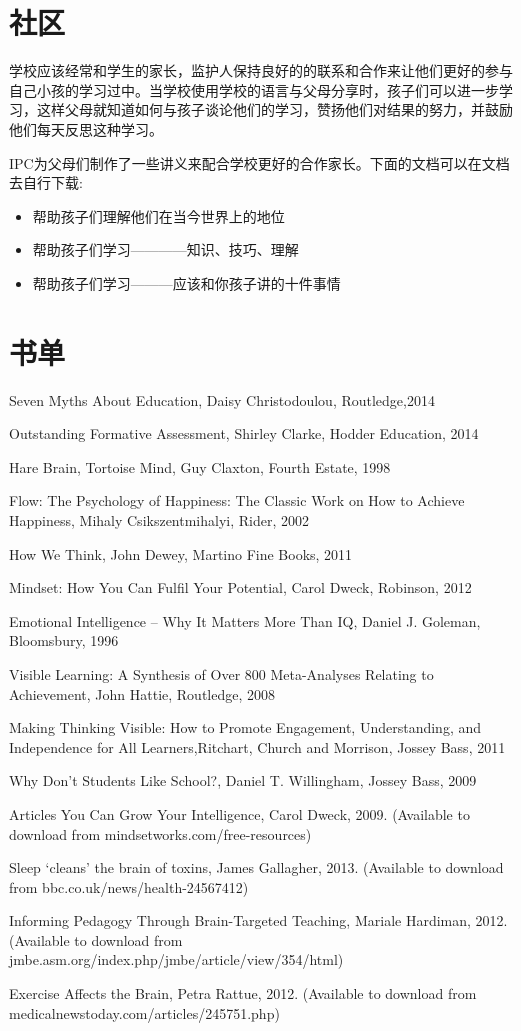 \section{社区}      
   学校应该经常和学生的家长，监护人保持良好的的联系和合作来让他们更好的参与自己小孩的学习过中。当学校使用学校的语言与父母分享时，孩子们可以进一步学习，这样父母就知道如何与孩子谈论他们的学习，赞扬他们对结果的努力，并鼓励他们每天反思这种学习。\par
   IPC为父母们制作了一些讲义来配合学校更好的合作家长。下面的文档可以在文档去自行下载:
   \begin{itemize}
     \item 帮助孩子们理解他们在当今世界上的地位
     \item 帮助孩子们学习————知识、技巧、理解
     \item 帮助孩子们学习———应该和你孩子讲的十件事情
\end{itemize}  

\section{书单}
Seven Myths About Education, Daisy Christodoulou, Routledge,2014 \par
 Outstanding Formative Assessment, Shirley Clarke, Hodder Education, 2014 \par
Hare Brain, Tortoise Mind, Guy Claxton, Fourth Estate, 1998\par
Flow: The Psychology of Happiness: The Classic Work on How to Achieve Happiness, Mihaly Csikszentmihalyi, Rider, 2002\par
How We Think, John Dewey, Martino Fine Books, 2011\par
Mindset: How You Can Fulfil Your Potential, Carol Dweck, Robinson, 2012\par
Emotional Intelligence – Why It Matters More Than IQ, Daniel J. Goleman, Bloomsbury, 1996\par
Visible Learning: A Synthesis of Over 800 Meta-Analyses Relating to Achievement, John Hattie, Routledge, 2008\par
Making Thinking Visible: How to Promote Engagement, Understanding, and Independence for All Learners,Ritchart, Church and Morrison, Jossey Bass, 2011\par
Why Don’t Students Like School?, Daniel T. Willingham, Jossey Bass, 2009\par
Articles You Can Grow Your Intelligence, Carol Dweck, 2009. (Available to download from mindsetworks.com/free-resources)\par
Sleep ‘cleans’ the brain of toxins, James Gallagher, 2013. (Available to download from bbc.co.uk/news/health-24567412)\par
Informing Pedagogy Through Brain-Targeted Teaching, Mariale Hardiman, 2012. (Available to download from jmbe.asm.org/index.php/jmbe/article/view/354/html)\par
Exercise Affects the Brain, Petra Rattue, 2012. (Available to download from medicalnewstoday.com/articles/245751.php)\par








